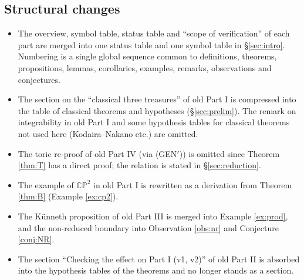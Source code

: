 \subsection{Structural changes}
\begin{itemize}
\item The overview, symbol table, status table and ``scope of verification'' of each part are merged into one status table and one symbol table in \S\ref{sec:intro}. Numbering is a single global sequence common to definitions, theorems, propositions, lemmas, corollaries, examples, remarks, observations and conjectures.
\item The section on the ``classical three treasures'' of old Part I is compressed into the table of classical theorems and hypotheses (\S\ref{sec:prelim}). The remark on integrability in old Part I and some hypothesis tables for classical theorems not used here (Kodaira--Nakano etc.) are omitted.
\item The toric re-proof of old Part IV (via (GEN$'$)) is omitted since Theorem \ref{thm:T} has a direct proof; the relation is stated in \S\ref{sec:reduction}.
\item The example of $\mathbb{CP}^2$ in old Part I is rewritten as a derivation from Theorem \ref{thm:B} (Example \ref{ex:cp2}).
\item The K\"unneth proposition of old Part III is merged into Example \ref{ex:prod}, and the non-reduced boundary into Observation \ref{obs:nr} and Conjecture \ref{conj:NR}.
\item The section ``Checking the effect on Part I (v1, v2)'' of old Part II is absorbed into the hypothesis tables of the theorems and no longer stands as a section.
\end{itemize}

